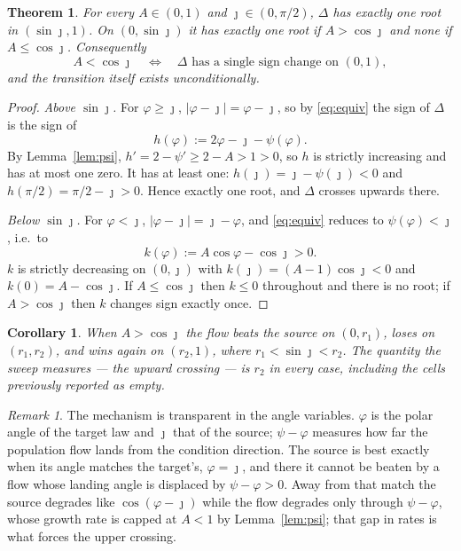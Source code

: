 \documentclass[11pt]{article}
\newtheorem{theorem}{Theorem}
\newtheorem{corollary}{Corollary}
\theoremstyle{definition}
\theoremstyle{remark}
\newtheorem{remark}{Remark}
\begin{document}
\begin{theorem}\label{thm:roots}
For every $A\in(0,1)$ and $\jmath\in(0,\pi/2)$, $\Delta$ has \emph{exactly one} root in
$(\sin\jmath,1)$. On $(0,\sin\jmath)$ it has exactly one root if $A>\cos\jmath$ and none if
$A\le\cos\jmath$. Consequently
\[
A<\cos\jmath\quad\Longleftrightarrow\quad
\Delta \text{ has a single sign change on }(0,1),
\]
and the transition itself exists unconditionally.
\end{theorem}

\begin{proof}
\emph{Above $\sin\jmath$.} For $\varphi\ge\jmath$, $|\varphi-\jmath|=\varphi-\jmath$, so by
\eqref{eq:equiv} the sign of $\Delta$ is the sign of
\[
h(\varphi):=2\varphi-\jmath-\psi(\varphi).
\]
By Lemma~\ref{lem:psi}, $h'=2-\psi'\ge 2-A>1>0$, so $h$ is strictly increasing and has at most
one zero. It has at least one: $h(\jmath)=\jmath-\psi(\jmath)<0$ and
$h(\pi/2)=\pi/2-\jmath>0$. Hence exactly one root, and $\Delta$ crosses upwards there.

\emph{Below $\sin\jmath$.} For $\varphi<\jmath$, $|\varphi-\jmath|=\jmath-\varphi$, and
\eqref{eq:equiv} reduces to $\psi(\varphi)<\jmath$, i.e.\ to
\[
k(\varphi):=A\cos\varphi-\cos\jmath>0 .
\]
$k$ is strictly decreasing on $(0,\jmath)$ with $k(\jmath)=(A-1)\cos\jmath<0$ and
$k(0)=A-\cos\jmath$. If $A\le\cos\jmath$ then $k\le0$ throughout and there is no root; if
$A>\cos\jmath$ then $k$ changes sign exactly once.
\end{proof}

\begin{corollary}
When $A>\cos\jmath$ the flow beats the source on $(0,r_1)$, loses on $(r_1,r_2)$, and wins again
on $(r_2,1)$, where $r_1<\sin\jmath<r_2$. The quantity the sweep measures --- the upward crossing
--- is $r_2$ in every case, including the cells previously reported as empty.
\end{corollary}

\begin{remark}
The mechanism is transparent in the angle variables. $\varphi$ is the polar angle of the target
law and $\jmath$ that of the source; $\psi-\varphi$ measures how far the population flow lands
from the condition direction. The source is best exactly when its angle matches the target's,
$\varphi=\jmath$, and there it cannot be beaten by a flow whose landing angle is displaced by
$\psi-\varphi>0$. Away from that match the source degrades like $\cos(\varphi-\jmath)$ while the
flow degrades only through $\psi-\varphi$, whose growth rate is capped at $A<1$ by
Lemma~\ref{lem:psi}; that gap in rates is what forces the upper crossing.
\end{remark}
\end{document}
